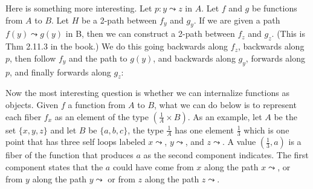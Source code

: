 \documentclass[11pt]{article}
\renewcommand{\path}{\leadsto}
\begin{document}
Here is something more interesting. Let $p : y \path z$ in $A$. Let $f$ and
$g$ be functions from $A$ to $B$. Let $H$ be a 2-path between $f_y$ and
$g_y$. If we are given a path $f(y) \path g(y)$ in B, then we can construct a
2-path between $f_z$ and $g_z$. (This is Thm 2.11.3 in the book.) We do this
going backwards along $f_z$, backwards along $p$, then follow $f_y$ and the
path to $g(y)$, and backwards along $g_y$, forwards along $p$, and finally
forwards along $g_z$:

\begin{center}
\end{center}

Now the most interesting question is whether we can internalize functions as
objects. Given $f$ a function from $A$ to $B$, what we can do below is to
represent each fiber $f_x$ as an element of the type $(\frac{1}{A} \times
B)$. As an example, let $A$ be the set $\{x,y,z\}$ and let $B$ be
$\{a,b,c\}$, the type $\frac{1}{A}$ has one element $\frac{1}{3}$ which is
one point that has three self loops labeled $x \path$, $y \path$, and $z
\path$. A value $(\frac{1}{3},a)$ is a fiber of the function that produces
$a$ as the second component indicates. The first component states that the
$a$ could have come from $x$ along the path $x \path$, or from $y$ along the
path $y \path$ or from $z$ along the path $z \path$.
\end{document}

